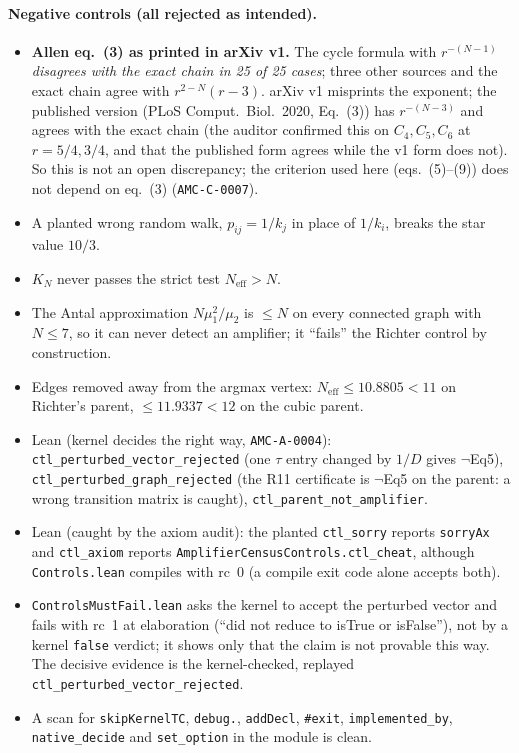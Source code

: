 \documentclass[10pt]{article}
\newcommand{\lean}[1]{\texttt{#1}}
\newcommand{\Neff}{N_{\mathrm{eff}}}
\begin{document}
\paragraph{Negative controls (all rejected as intended).}
\begin{itemize}\itemsep=0pt
\item \textbf{Allen eq.~(3) as printed in arXiv v1.} The cycle formula with $r^{-(N-1)}$ \emph{disagrees with the exact chain in 25 of 25 cases}; three other sources and the exact chain agree with $r^{2-N}(r-3)$. arXiv v1 misprints the exponent; the published version (PLoS Comput.\ Biol.\ 2020, Eq.~(3)) has $r^{-(N-3)}$ and agrees with the exact chain (the auditor confirmed this on $C_4,C_5,C_6$ at $r=5/4,3/4$, and that the published form agrees while the v1 form does not). So this is not an open discrepancy; the criterion used here (eqs.~(5)--(9)) does not depend on eq.~(3) (\texttt{AMC-C-0007}).
\item A planted wrong random walk, $p_{ij}=1/k_j$ in place of $1/k_i$, breaks the star value $10/3$.
\item $K_N$ never passes the strict test $\Neff>N$.
\item The Antal approximation $N\mu_1^2/\mu_2$ is $\le N$ on every connected graph with $N\le7$, so it can never detect an amplifier; it ``fails'' the Richter control by construction.
\item Edges removed away from the argmax vertex: $\Neff\le10.8805<11$ on Richter's parent, $\le11.9337<12$ on the cubic parent.
\item Lean (kernel decides the right way, \texttt{AMC-A-0004}): \lean{ctl\_perturbed\_vector\_rejected} (one $\tau$ entry changed by $1/D$ gives $\neg$Eq5), \lean{ctl\_perturbed\_graph\_rejected} (the R11 certificate is $\neg$Eq5 on the parent: a wrong transition matrix is caught), \lean{ctl\_parent\_not\_amplifier}.
\item Lean (caught by the axiom audit): the planted \lean{ctl\_sorry} reports \lean{sorryAx} and \lean{ctl\_axiom} reports \lean{AmplifierCensusControls.ctl\_cheat}, although \texttt{Controls.lean} compiles with rc~0 (a compile exit code alone accepts both).
\item \texttt{ControlsMustFail.lean} asks the kernel to accept the perturbed vector and fails with rc~1 at elaboration (``did not reduce to isTrue or isFalse''), not by a kernel \texttt{false} verdict; it shows only that the claim is not provable this way. The decisive evidence is the kernel-checked, replayed \lean{ctl\_perturbed\_vector\_rejected}.
\item A scan for \lean{skipKernelTC}, \lean{debug.}, \lean{addDecl}, \lean{\#exit}, \lean{implemented\_by}, \lean{native\_decide} and \lean{set\_option} in the module is clean.
\end{itemize}
\end{document}
